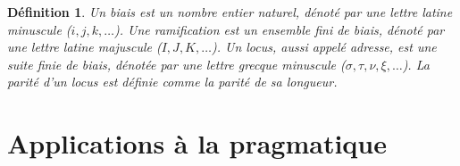 \documentclass[12pt]{report}
\newtheorem{definition}{Définition}
\begin{document}
\begin{definition}
	Un \emph{biais} est un nombre entier naturel, dénoté par une lettre latine minuscule ($i,j,k,\ldots$). Une \emph{ramification} est un ensemble fini de biais, dénoté par une lettre latine majuscule ($I,J,K,\ldots$). Un \emph{locus}, aussi appelé \emph{adresse}, est une suite finie de biais, dénotée par une lettre grecque minuscule ($\sigma,\tau,\nu,\xi,\ldots$). La \emph{parité} d'un locus est définie comme la parité de sa longueur.
\end{definition}





\chapter*{Applications à la pragmatique}

\nocite{Tai68}
\nocite{Lec11}
\nocite{Gir03}
\nocite{Gir06}



\end{document}
